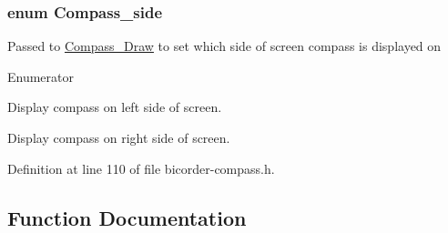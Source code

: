 \subsubsection[{\texorpdfstring{Compass\+\_\+side}{Compass_side}}]{\setlength{\rightskip}{0pt plus 5cm}enum {\bf Compass\+\_\+side}}\hypertarget{bicorder-compass_8h_a7e36843c53aaafda9795876e659ffe7b}{}\label{bicorder-compass_8h_a7e36843c53aaafda9795876e659ffe7b}
Passed to \hyperlink{bicorder-compass_8h_a0ae721c1c17301cdf28bd0668a4f90af}{Compass\+\_\+\+Draw} to set which side of screen compass is displayed on \begin{Desc}
\item[Enumerator]\par
\begin{description}
\item[{\em 
C\+O\+M\+P\+A\+S\+S\+\_\+\+L\+E\+FT\hypertarget{bicorder-compass_8h_a7e36843c53aaafda9795876e659ffe7ba15cd36c342feb4b23e9a69bda67bcca8}{}\label{bicorder-compass_8h_a7e36843c53aaafda9795876e659ffe7ba15cd36c342feb4b23e9a69bda67bcca8}
}]Display compass on left side of screen. \item[{\em 
C\+O\+M\+P\+A\+S\+S\+\_\+\+R\+I\+G\+HT\hypertarget{bicorder-compass_8h_a7e36843c53aaafda9795876e659ffe7ba61001c6c8cf0fa674b3039da44c1b005}{}\label{bicorder-compass_8h_a7e36843c53aaafda9795876e659ffe7ba61001c6c8cf0fa674b3039da44c1b005}
}]Display compass on right side of screen. \end{description}
\end{Desc}


Definition at line 110 of file bicorder-\/compass.\+h.



\subsection{Function Documentation}

